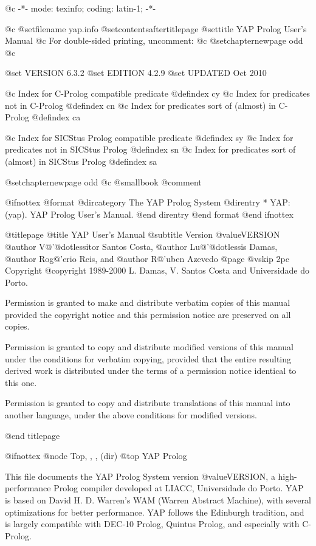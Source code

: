  @c -*- mode: texinfo; coding: latin-1; -*-

@c %
@setfilename yap.info
@setcontentsaftertitlepage
@settitle YAP Prolog User's Manual
@c For double-sided printing, uncomment:
@c @setchapternewpage odd
@c %

@set VERSION 6.3.2
@set EDITION 4.2.9
@set UPDATED Oct 2010

@c Index for C-Prolog compatible predicate
@defindex cy
@c Index for predicates not in C-Prolog
@defindex cn
@c Index for predicates sort of (almost) in C-Prolog
@defindex ca

@c Index for SICStus Prolog compatible predicate
@defindex sy
@c Index for predicates not in SICStus Prolog
@defindex sn
@c Index for predicates sort of (almost) in SICStus Prolog
@defindex sa


@setchapternewpage odd
@c @smallbook
@comment %

@ifnottex
@format
@dircategory The YAP Prolog System
@direntry
* YAP: (yap).           YAP Prolog User's Manual.
@end direntry
@end format
@end ifnottex

@titlepage
@title YAP User's Manual
@subtitle Version @value{VERSION}
@author V@'{@dotless{i}}tor Santos Costa,
@author Lu@'{@dotless{i}}s Damas,
@author Rog@'erio Reis, and
@author R@'uben Azevedo
@page
@vskip 2pc
Copyright @copyright{} 1989-2000 L. Damas, V. Santos Costa and Universidade
do Porto.

Permission is granted to make and distribute verbatim copies of
this manual provided the copyright notice and this permission notice
are preserved on all copies.

Permission is granted to copy and distribute modified versions of this
manual under the conditions for verbatim copying, provided that the entire
resulting derived work is distributed under the terms of a permission
notice identical to this one.

Permission is granted to copy and distribute translations of this manual
into another language, under the above conditions for modified versions.

@end titlepage

@ifnottex
@node Top, , , (dir)
@top YAP Prolog

This file documents the YAP Prolog System version @value{VERSION}, a
high-performance Prolog compiler developed at LIACC, Universidade do
Porto. YAP is based on David H. D. Warren's WAM (Warren Abstract
Machine), with several optimizations for better performance. YAP follows
the Edinburgh tradition, and is largely compatible with DEC-10 Prolog,
Quintus Prolog, and especially with C-Prolog.


